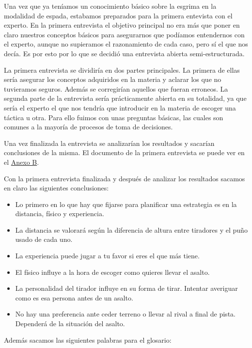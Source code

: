 Una vez que ya teníamos un conocimiento básico sobre la esgrima en la modalidad de espada,
estabamos preparados para la primera entevista con el experto. En la primera entrevista el
objetivo principal no era más que poner en claro nuestros conceptos básicos para asegurarnos
que podíamos entendernos con el experto, aunque no supieramos el razonamiento de cada caso,
pero sí el que nos decía. Es por esto por lo que se decidió una entrevista abierta semi-estructurada.

La primera entrevista se dividiría en dos partes principales. La primera de ellas sería
asegurar los conceptos adquiridos en la materia y aclarar los que no tuvieramos seguros.
Además se corregirían aquellos que fueran erroneos. La segunda parte de la entrevista
sería prácticamente abierta en su totalidad, ya que sería el experto el que nos tendría
que introducir en la materia de escoger una táctica u otra. Para ello fuimos con unas
preguntas básicas, las cuales son comunes a la mayoría de procesos de toma de decisiones.

Una vez finalizada la entrevista se analizarían los resultados y sacarían conclusiones de la misma.
El documento de la primera entrevista se puede ver en el \hyperref[cap:Entrevsitas]{Anexo B}.

Con la primera entrevista finalizada y después de analizar los resultados sacamos en claro
las siguientes conclusiones:

\begin{itemize}
  \item Lo primero en lo que hay que fijarse para planificar una estrategia es en la distancia,
    físico y experiencia.
  \item La distancia se valorará según la diferencia de altura entre tiradores y el puño usado
    de cada uno.
  \item La experiencia puede jugar a tu favor si eres el que más tiene.
  \item El físico influye a la hora de escoger como quieres llevar el asalto.
  \item La personalidad del tirador influye en su forma de tirar. Intentar averiguar como es esa persona
    antes de un asalto.
  \item No hay una preferencia ante ceder terreno o llevar al rival a final de pista. Dependerá de la
    situación del asalto.
\end{itemize}

Además sacamos las siguientes palabras para el glosario:

